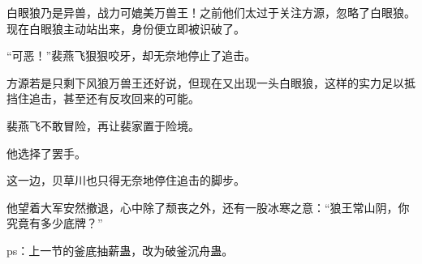 \begin{this_body}
白眼狼乃是异兽，战力可媲美万兽王！之前他们太过于关注方源，忽略了白眼狼。现在白眼狼主动站出来，身份便立即被识破了。

“可恶！”裴燕飞狠狠咬牙，却无奈地停止了追击。

方源若是只剩下风狼万兽王还好说，但现在又出现一头白眼狼，这样的实力足以抵挡住追击，甚至还有反攻回来的可能。

裴燕飞不敢冒险，再让裴家置于险境。

他选择了罢手。

这一边，贝草川也只得无奈地停住追击的脚步。

他望着大军安然撤退，心中除了颓丧之外，还有一股冰寒之意：“狼王常山阴，你究竟有多少底牌？”

ps：上一节的釜底抽薪蛊，改为破釜沉舟蛊。

\end{this_body}

